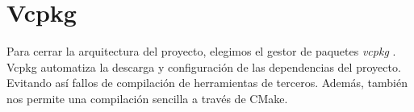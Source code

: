 \section{Vcpkg}
Para cerrar la arquitectura del proyecto, elegimos el gestor de paquetes \textit{vcpkg} \parencite{vcpkg_ms}. 
Vcpkg automatiza la descarga y configuración de las dependencias del proyecto. Evitando así fallos de compilación de herramientas de terceros. Además, también nos permite una compilación sencilla a través de CMake.                            

